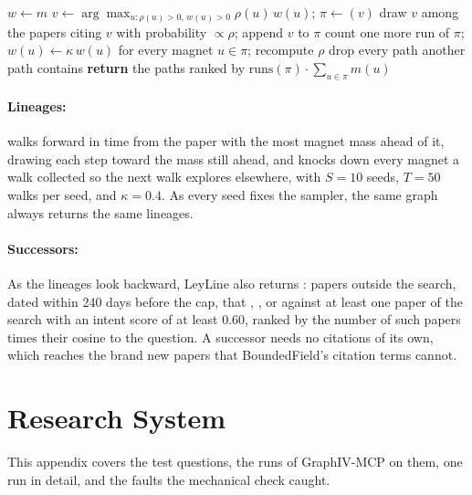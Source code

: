 \begin{algorithm}[t]
\caption{LeyLine's lineages.}
\label{alg:leyline}
\begin{algorithmic}
    \STATE $w \gets m$
        \STATE $v \gets \arg\max_{u : \rho(u) > 0,\, w(u) > 0} \rho(u)\, w(u)$; $\pi \gets (v)$
            \STATE draw $v$ among the papers citing $v$ with probability $\propto \rho$; append $v$ to $\pi$
        \ENDWHILE
        \STATE count one more run of $\pi$; $w(u) \gets \kappa\, w(u)$ for every magnet $u \in \pi$; recompute $\rho$
    \ENDFOR
\ENDFOR
\STATE drop every path another path contains
\STATE \textbf{return} the paths ranked by $\text{runs}(\pi) \cdot \sum_{u \in \pi} m(u)$
\end{algorithmic}
\end{algorithm}

\paragraph{Lineages:}
 walks forward in time from the paper with the most magnet mass ahead of it, drawing each step toward the mass still ahead, and knocks down every magnet a walk collected so the next walk explores elsewhere, with $S = 10$ seeds, $T = 50$ walks per seed, and $\kappa = 0.4$. As every seed fixes the sampler, the same graph always returns the same lineages.

\paragraph{Successors:}
As the lineages look backward, LeyLine also returns : papers outside the search, dated within 240 days before the cap, that , , or  against at least one paper of the search with an intent score of at least 0.60, ranked by the number of such papers times their cosine to the question. A successor needs no citations of its own, which reaches the brand new papers that BoundedField's citation terms cannot.

\FloatBarrier
\section{Research System}
\label{app:system}

This appendix covers the test questions, the runs of GraphIV-MCP on them, one run in detail, and the faults the mechanical check caught.

